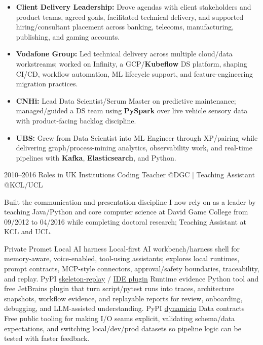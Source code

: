 \documentclass[]{../../friggeri-cv}
\begin{document}
\begin{entrylist}
{{        }
        \begin{itemize}[leftmargin=1.1em]
            \item \footnotesize\textbf{Client Delivery Leadership:} Drove agendas with client stakeholders and product teams, agreed goals, facilitated technical delivery, and supported hiring/consultant placement across banking, telecoms, manufacturing, publishing, and gaming accounts.
            \item \footnotesize\textbf{Vodafone Group:} Led technical delivery across multiple cloud/data workstreams; worked on Infinity, a GCP/\textbf{Kubeflow} DS platform, shaping CI/CD, workflow automation, ML lifecycle support, and feature-engineering migration practices.
            \item \footnotesize\textbf{CNHi:} Lead Data Scientist/Scrum Master on predictive maintenance; managed/guided a DS team using \textbf{PySpark} over live vehicle sensory data with product-facing backlog discipline.
            \item \footnotesize\textbf{UBS:} Grew from Data Scientist into ML Engineer through XP/pairing while delivering graph/process-mining analytics, observability work, and real-time pipelines with \textbf{Kafka}, \textbf{Elasticsearch}, and Python.
        \end{itemize}
    }
    \entry
    {2010--2016}
    {Roles in UK Institutions}
    {\small Coding Teacher @DGC | Teaching Assistant @KCL/UCL}
    {
        {\small
        \setlength{\parindent}{0pt}
        \setlength{\leftskip}{0pt}
        Built the communication and presentation discipline I now rely on as a leader by teaching Java/Python and core computer science at David Game College from 09/2012 to 04/2016 while completing doctoral research; Teaching Assistant at KCL and UCL.

        }
    }
\end{entrylist}
\newpage
\setlength{\parskip}{2pt}
\setlength{\parsep}{0pt}
\begin{entrylist2}
    \entrytwo
        {\small Private}
        {\small Promet}
        {\small Local AI harness}
        {\footnotesize Local-first AI workbench/harness shell for memory-aware, voice-enabled, tool-using assistants; explores local runtimes, prompt contracts, MCP-style connectors, approval/safety boundaries, traceability, and replay.}
    \entrytwo
        {\small PyPI}
        {\small \href{https://pypi.org/project/skeleton-replay/}{skeleton-replay} / \href{https://plugins.jetbrains.com/plugin/32807-skeleton-replay}{IDE plugin}}
        {\small Runtime evidence}
        {\footnotesize Python tool and free JetBrains plugin that turn script/pytest runs into traces, architecture snapshots, workflow evidence, and replayable reports for review, onboarding, debugging, and LLM-assisted understanding.}
    \entrytwo
        {\small PyPI}
        {\small \href{https://pypi.org/project/dynamicio/}{dynamicio}}
        {\small Data contracts}
        {\footnotesize Free public tooling for making I/O seams explicit, validating schema/data expectations, and switching local/dev/prod datasets so pipeline logic can be tested with faster feedback.}
\end{entrylist2}
\end{document}
